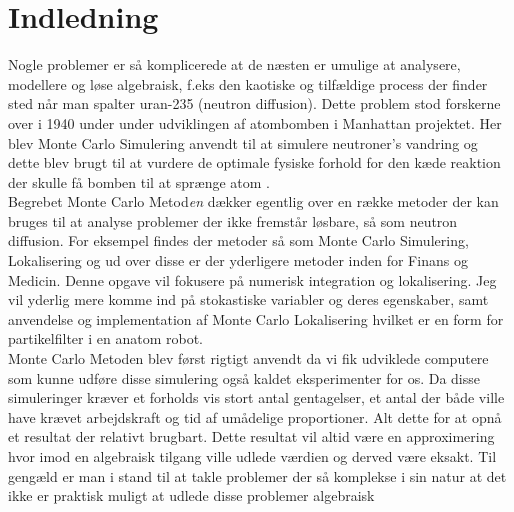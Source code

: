 \documentclass[../../SRP.tex]{subfiles}
\begin{document}
\chapter{Indledning}

Nogle problemer er så komplicerede at de næsten er umulige at analysere, modellere og løse algebraisk, f.eks den kaotiske og tilfældige process der finder sted når man spalter uran-235 (neutron diffusion). Dette problem stod forskerne over i 1940 under under udviklingen af atombomben i Manhattan projektet. Her blev Monte Carlo Simulering anvendt til at simulere neutroner's vandring og dette blev brugt til at vurdere de optimale fysiske forhold for den kæde reaktion der skulle få bomben til at sprænge atom \cite{AHF}. \\

Begrebet Monte Carlo Metod\textit{en} dækker egentlig over en række metoder der kan bruges til at analyse problemer der ikke fremstår løsbare, så som neutron diffusion. For eksempel findes der metoder så som Monte Carlo Simulering, Lokalisering og ud over disse er der yderligere metoder inden for Finans og Medicin. Denne opgave vil fokusere på numerisk integration og lokalisering. Jeg vil yderlig mere komme ind på stokastiske variabler og deres egenskaber, samt anvendelse og implementation af Monte Carlo Lokalisering hvilket er en form for partikelfilter i en anatom robot. \\

Monte Carlo Metoden blev først rigtigt anvendt da vi fik udviklede computere som kunne udføre disse simulering også kaldet eksperimenter for os. Da disse simuleringer kræver et forholds vis stort antal gentagelser, et antal der både ville have krævet arbejdskraft og tid af umådelige proportioner. Alt dette for at opnå et resultat der relativt brugbart. Dette resultat vil altid være en approximering hvor imod en algebraisk tilgang ville udlede værdien og derved være eksakt. Til gengæld er man i stand til at takle problemer der så komplekse i sin natur at det ikke er praktisk muligt at udlede disse problemer algebraisk \cite{SBM} \\
\end{document}

